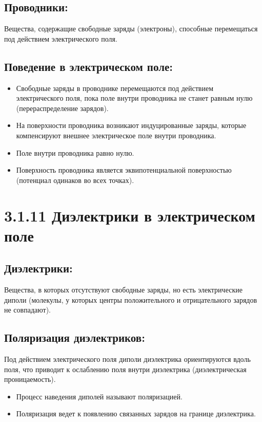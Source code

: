 \documentclass[a4paper,12pt]{article}
\begin{document}
\subsection*{Проводники:}
\vspace{-3pt}
Вещества, содержащие свободные заряды (электроны), способные перемещаться под действием электрического поля.

\vspace{-9pt}
\subsection*{Поведение в электрическом поле:}
\vspace{-3pt}
\begin{itemize}
    \item Свободные заряды в проводнике перемещаются под действием электрического поля, пока поле внутри проводника не станет равным нулю (перераспределение зарядов).
    \item На поверхности проводника возникают индуцированные заряды, которые компенсируют внешнее электрическое поле внутри проводника.
    \item Поле внутри проводника равно нулю.
    \item Поверхность проводника является эквипотенциальной поверхностью (потенциал одинаков во всех точках).
\end{itemize}


\section*{3.1.11 Диэлектрики в электрическом поле}
\vspace{-9pt}
\subsection*{Диэлектрики:}
\vspace{-3pt}
Вещества, в которых отсутствуют свободные заряды, но есть электрические диполи (молекулы, у которых центры положительного и отрицательного зарядов не совпадают).

\vspace{-9pt}
\subsection*{Поляризация диэлектриков:}
\vspace{-3pt}
Под действием электрического поля диполи диэлектрика ориентируются вдоль поля, что приводит к ослаблению поля внутри диэлектрика (диэлектрическая проницаемость).
\begin{itemize}
    \item Процесс наведения диполей называют поляризацией.
    \item Поляризация ведет к появлению связанных зарядов на границе диэлектрика.
\end{itemize}
\end{document}
